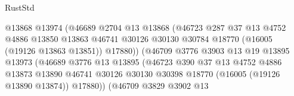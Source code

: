 \begin{lexlean}{RustStd}
\begin{coremodule}
                                        @13868
                                        @13974
                                        (@46689
                                          @2704
                                          @13
                                          @13868
                                          (@46723
                                            @287
                                            @37
                                            @13
                                            @4752
                                            @4886
                                            @13850
                                            @13863
                                            @46741
                                            @30126
                                            @30130
                                            @30784
                                            @18770
                                            (@16005 (@19126 @13863 @13851))
                                            @17880))
                                        (@46709
                                          @3776
                                          @3903
                                          @13
                                          @19
                                          @13895
                                          @13973
                                          (@46689
                                            @3776
                                            @13
                                            @13895
                                            (@46723
                                              @390
                                              @37
                                              @13
                                              @4752
                                              @4886
                                              @13873
                                              @13890
                                              @46741
                                              @30126
                                              @30130
                                              @30398
                                              @18770
                                              (@16005 (@19126 @13890 @13874))
                                              @17880))
                                          (@46709
                                            @3829
                                            @3902
                                            @13

\end{coremodule}
\end{lexlean}
